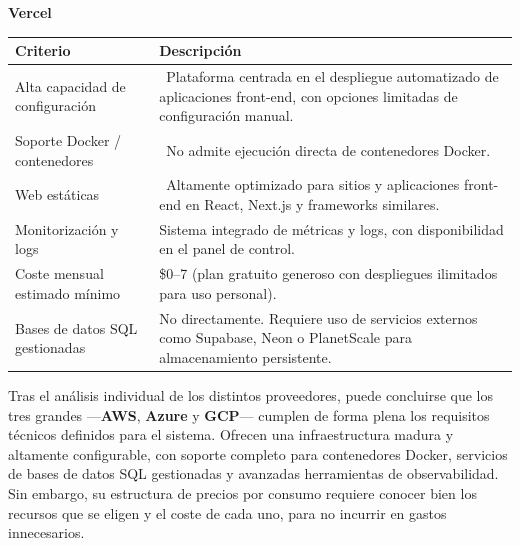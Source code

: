 \begin{center}
	\renewcommand{\arraystretch}{1.2}
	\setlength{\tabcolsep}{6pt}
	\textbf{Vercel}\\[4pt]
	\begin{tabularx}{\textwidth}{|l|X|}
		\hline
		\textbf{Criterio}               & \textbf{Descripción}                                                                                                                 \\
		\hline
		Alta capacidad de configuración & \xmark\ Plataforma centrada en el despliegue automatizado de aplicaciones front-end, con opciones limitadas de configuración manual. \\
		\hline
		Soporte Docker / contenedores   & \xmark\ No admite ejecución directa de contenedores Docker.                                                                          \\
		\hline
		Web estáticas                   & \checkmark\ Altamente optimizado para sitios y aplicaciones front-end en React, Next.js y frameworks similares.                      \\
		\hline
		Monitorización y logs           & Sistema integrado de métricas y logs, con disponibilidad en el panel de control.                                                     \\
		\hline
		Coste mensual estimado mínimo   & \$0--7 (plan gratuito generoso con despliegues ilimitados para uso personal).                                                        \\
		\hline
		Bases de datos SQL gestionadas  & No directamente. Requiere uso de servicios externos como Supabase, Neon o PlanetScale para almacenamiento persistente.               \\
		\hline
	\end{tabularx}
\end{center}


Tras el análisis individual de los distintos proveedores, puede concluirse que los tres grandes —\textbf{AWS}, \textbf{Azure} y \textbf{GCP}— cumplen de forma plena los requisitos técnicos definidos para el sistema. Ofrecen una infraestructura madura y altamente configurable, con soporte completo para contenedores Docker, servicios de bases de datos SQL gestionadas y avanzadas herramientas de observabilidad. Sin embargo, su estructura de precios por consumo requiere conocer bien los recursos que se eligen y el coste de cada uno, para no incurrir en gastos innecesarios.

